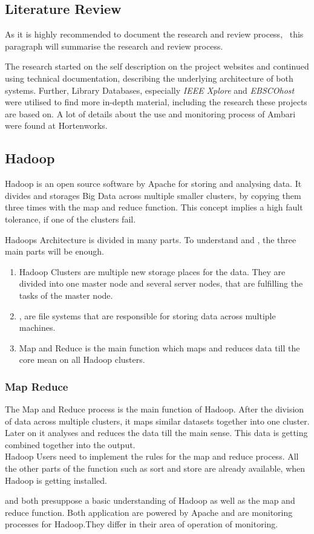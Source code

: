 \subsection{Literature Review}
As it is highly recommended to document the research and review process,~\cite{brocke09} this paragraph will summarise the research and review process.

The research started on the self description on the project websites and continued using technical documentation, describing the underlying architecture of both systems.
Further, Library Databases, especially \emph{IEEE Xplore} and \emph{EBSCOhost} were utilised to find more in-depth material, including the research these projects are based on. A lot of details about the use and monitoring process of Ambari were found at Hortenworks.
	
\subsection{Hadoop}
\label{subsec:Hadoop}
Hadoop is an open source software by Apache for storing and analysing data.\cite{Dagli2014} It divides and storages Big Data across multiple smaller clusters, by copying them three times with the map and reduce function. This concept implies a high fault tolerance, if one of the clusters fail.\cite{Dagli2014}

Hadoops Architecture is divided in many parts. To understand \amb and \chuk, the three main parts will be enough.\cite{Dagli2014}
  \\
  \begin{enumerate}
  	\item Hadoop Clusters are multiple new storage places for the data. They are divided into one master node and several server nodes, that are fulfilling the tasks of the master node.\cite{Dagli2014}
  	\item \hdfs, are file systems that are responsible for storing data across multiple machines.\cite{Dagli2014}
  	\item Map and Reduce is the main function which maps and reduces data till the core mean on all Hadoop clusters.\cite{Dagli2014}
  \end{enumerate}

\subsubsection*{Map Reduce}
The Map and Reduce process is the main function of Hadoop. After the division of data across multiple clusters, it maps similar datasets together into one cluster. 
Later on it analyses and reduces the data till the main sense. This data is getting combined together into the output. \cite{Dagli2014}
\\
Hadoop Users need to implement the rules for the map and reduce process. All the other parts of the function such as sort and store are already available, when Hadoop is getting installed.\cite{Dagli2014}


\amb and \chuk both presuppose a basic understanding of Hadoop as well as the map and reduce function. Both application are powered by Apache and are monitoring processes for Hadoop.They differ in their area of operation of monitoring. 